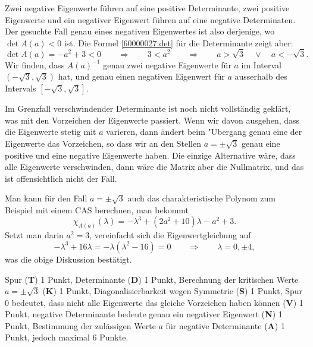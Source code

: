 \begin{loesung}
\begin{teilaufgaben}
Zwei negative Eigenwerte führen auf eine positive Determinante,
zwei positive Eigenwerte und ein negativer Eigenwert führen auf
eine negative Determinaten.
Der gesuchte Fall genau eines negativen Eigenwertes ist also derjenige,
wo $\det A(a) <0$ ist.
Die Formel \eqref{60000027:det} für die Determinante zeigt aber:
\[
\det A(a) = -a^2 + 3 < 0
\qquad\Rightarrow\qquad
3 < a^2
\qquad\Rightarrow\qquad
a >\sqrt{3}\quad\vee\quad a < -\sqrt{3}.
\]
Wir finden, dass $A(a)^{-1}$ genau zwei negative Eigenwerte für $a$ im Interval
$(-\sqrt{3},\sqrt{3})$ hat, und genau einen negativen Eigenwert für
$a$ ausserhalb des Intervals $[-\sqrt{3},\sqrt{3}]$.
\qedhere
\end{teilaufgaben}
\end{loesung}

\begin{diskussion}
Im Grenzfall verschwindender Determinante ist noch nicht vollständig
geklärt, was mit den Vorzeichen der Eigenwerte passiert.
Wenn wir davon ausgehen, dass die Eigenwerte stetig mit $a$ varieren,
dann ändert beim "Ubergang genau eine der Eigenwerte das Vorzeichen,
so dass wir an den Stellen $a=\pm\sqrt{3}$ genau eine positive und
eine negative Eigenwerte haben.
Die einzige Alternative wäre, dass alle Eigenwerte verschwinden,
dann wäre die Matrix aber die Nullmatrix, und das ist offensichtlich
nicht der Fall.

Man kann für den Fall $a=\pm\sqrt{3}$ auch das charakteristische Polynom
zum Beispiel mit einem CAS berechnen, man bekommt
\[
\chi_{A(a)}(\lambda)
=
-\lambda^3+(2a^2+10)\lambda-a^2+3.
\]
Setzt man darin $a^2=3$, vereinfacht sich die Eigenwertgleichung auf
\[
-\lambda^3 +16\lambda
=
-\lambda(\lambda^2 -16)=0
\qquad\Rightarrow\qquad \lambda = 0,\pm 4,
\]
was die obige Diskussion bestätigt.
\end{diskussion}

\begin{bewertung}
Spur ({\bf T}) 1 Punkt,
Determinante ({\bf D}) 1 Punkt,
Berechnung der kritischen Werte $a=\pm\sqrt{3}$ ({\bf K}) 1 Punkt,
Diagonalisierbarkeit wegen Symmetrie ({\bf S}) 1 Punkt,
Spur $0$ bedeutet, dass nicht alle Eigenwerte das gleiche Vorzeichen
haben können ({\bf V}) 1 Punkt,
negative Determinante bedeute genau ein negativer Eigenwert ({\bf N}) 1 Punkt,
Bestimmung der zulässigen Werte $a$ für negative Determinante ({\bf A})
1 Punkt, jedoch maximal 6 Punkte.
\end{bewertung}

